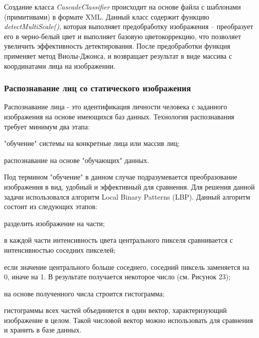 Создание класса \textit{CascadeClassifier} происходит на основе файла с шаблонами
(примитивами) в формате XML. Данный класс содержит функцию
\textit{detectMultiScale()}, которая выполняет предобработку изображения --
преобразует его в черно-белый цвет и выполняет базовую цветокоррекцию, что
позволяет увеличить эффективность детектирования. После предобработки функция
применяет метод Виолы-Джонса, и возвращает результат в виде массива
с координатами лица на изображении. 

\subsubsection{Распознавание лиц со статического изображения}

Распознавание лица - это идентификация личности человека с заданного
изображения на основе имеющихся баз данных. Технология распознавания требует
минимум два этапа:

\begin{itemize*}
\item "обучение" системы на конкретные лица или массив лиц;
\item распознавание на основе "обучающих" данных.
\end{itemize*}

Под термином "обучение" в данном случае подразумевается преобразование
изображения в вид, удобный и эффективный для сравнения.
Для решения данной задачи использовался алгоритм Local Binary Patterns (LBP).
Данный алгоритм состоит из следующих этапов:

\begin{itemize*}
  \item разделить изображение на части;
  \item в каждой части интенсивность цвета центрального пикселя сравнивается
    с интенсивностью соседних пикселей;
  \item если значение центрального больше соседнего, соседний пиксель
    заменяется на 0, иначе на 1. В результате получается некоторое число (см.
    Рисунок 23);
  \item на основе полученного числа строится гистограмма;
  \item гистограммы всех частей объединяется в один вектор, характеризующий
    изображение в целом. Такой числовой вектор можно использовать для сравнения
    и хранить в базе данных.
\end{itemize*}



